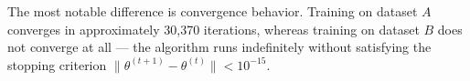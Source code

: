 \begin{answer}
The most notable difference is convergence behavior. Training on dataset $A$ converges in approximately 30,370 iterations, whereas training on dataset $B$ does not converge at all — the algorithm runs indefinitely without satisfying the stopping criterion $\|\theta^{(t+1)} - \theta^{(t)}\| < 10^{-15}$.
\end{answer}
